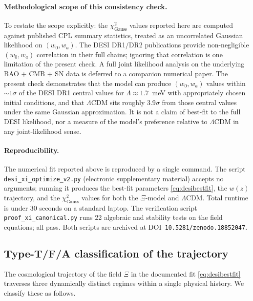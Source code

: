 \documentclass[11pt,reqno]{amsart}
\theoremstyle{plain}
\theoremstyle{definition}
\theoremstyle{remark}
\begin{document}
\paragraph{Methodological scope of this consistency check.}
To restate the scope explicitly: the $\chi^{2}_{\text{Gauss}}$ values
reported here are computed against published CPL summary statistics,
treated as an uncorrelated Gaussian likelihood on $(w_0, w_a)$. The
DESI DR1/DR2 publications provide non-negligible $(w_0, w_a)$
correlation in their full chains; ignoring that correlation is one
limitation of the present check. A full joint likelihood analysis
on the underlying BAO + CMB + SN data is deferred to a companion
numerical paper. The present check demonstrates that the model can
produce $(w_0, w_a)$ values within $\sim 1\sigma$ of the DESI DR1
central values for $\Lambda \approx 1.7$~meV with appropriately
chosen initial conditions, and that $\Lambda$CDM sits roughly
$3.9\sigma$ from those central values under the same Gaussian
approximation. It is not a claim of best-fit to the full DESI
likelihood, nor a measure of the model's preference relative to
$\Lambda$CDM in any joint-likelihood sense.

\paragraph{Reproducibility.}
The numerical fit reported above is reproduced by a single command. The
script \texttt{desi\_xi\_optimize\_v2.py} (electronic supplementary material)
accepts no arguments; running it produces the best-fit parameters
\eqref{eq:desibestfit}, the $w(z)$ trajectory, and the
$\chi^{2}_{\text{Gauss}}$ values for both the $\Xi$-model and
$\Lambda$CDM. Total runtime is under 30 seconds on a standard laptop.
The verification script \texttt{proof\_xi\_canonical.py} runs 22
algebraic and stability tests on the field equations; all pass. Both
scripts are archived at DOI~\texttt{10.5281/zenodo.18852047}.

\subsection{Type-T/F/A classification of the trajectory}\label{sec:typeTFA}

The cosmological trajectory of the field $\Xi$ in the documented fit
\eqref{eq:desibestfit} traverses three dynamically distinct regimes
within a single physical history. We classify these as follows.
\end{document}
